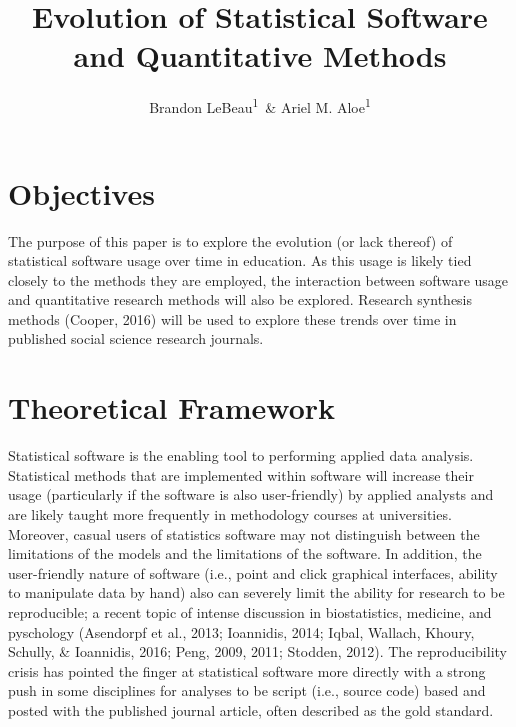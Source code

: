 \documentclass[english,,man]{apa6}
\title{Evolution of Statistical Software and Quantitative Methods}
\author{Brandon LeBeau\textsuperscript{1}~\& Ariel M. Aloe\textsuperscript{1}}
\date{}
\affiliation{
\vspace{0.5cm}
\textsuperscript{1} University of Iowa}
\theoremstyle{definition}
\theoremstyle{definition}
\theoremstyle{definition}
\theoremstyle{remark}
\begin{document}
\maketitle

\hypertarget{objectives}{%
\section{Objectives}\label{objectives}}

The purpose of this paper is to explore the evolution (or lack thereof)
of statistical software usage over time in education. As this usage is
likely tied closely to the methods they are employed, the interaction
between software usage and quantitative research methods will also be
explored. Research synthesis methods (Cooper, 2016) will be used to
explore these trends over time in published social science research
journals.

\hypertarget{theoretical-framework}{%
\section{Theoretical Framework}\label{theoretical-framework}}

Statistical software is the enabling tool to performing applied data
analysis. Statistical methods that are implemented within software will
increase their usage (particularly if the software is also
user-friendly) by applied analysts and are likely taught more frequently
in methodology courses at universities. Moreover, casual users of
statistics software may not distinguish between the limitations of the
models and the limitations of the software. In addition, the
user-friendly nature of software (i.e., point and click graphical
interfaces, ability to manipulate data by hand) also can severely limit
the ability for research to be reproducible; a recent topic of intense
discussion in biostatistics, medicine, and pyschology (Asendorpf et al.,
2013; Ioannidis, 2014; Iqbal, Wallach, Khoury, Schully, \& Ioannidis,
2016; Peng, 2009, 2011; Stodden, 2012). The reproducibility crisis has
pointed the finger at statistical software more directly with a strong
push in some disciplines for analyses to be script (i.e., source code)
based and posted with the published journal article, often described as
the gold standard.
\end{document}
